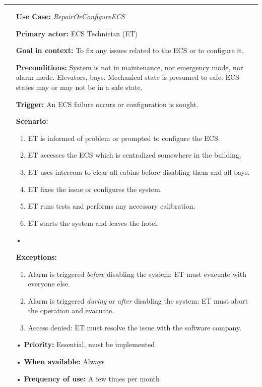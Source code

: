 \documentclass[12pt]{article}
\begin{document}
	\par\noindent\rule{\textwidth}{0.4pt}
		\begin{itemize} %
			\item[] \textbf{Use Case:} \textit{RepairOrConfigureECS}
			\item[] \textbf{Primary actor:} ECS Technician (ET)
			\item[] \textbf{Goal in context:} To fix any issues related to the ECS or to configure it.
			\item[] \textbf{Preconditions:} System is not in maintenance, nor emergency mode, nor alarm mode. 
			Elevators, bays. Mechanical state is presumed to safe. ECS states may or may not be in a safe state.
			\item[] \textbf{Trigger:} An ECS failure occurs or configuration is sought.
			\item[] { \textbf{Scenario:}
		        \begin{enumerate}
		        	\item ET is informed of problem or prompted to configure the ECS.
		        	\item ET accesses the ECS which is centralized somewhere in the building.
		        	\item ET uses intercom to clear all cabins before disabling them and all bays.
		        	\item ET fixes the issue or configures the system.
		        	\item ET runs tests and performs any necessary calibration.
		        	\item ET starts the system and leaves the hotel.
		        \end{enumerate}}
			\item[•]{\textbf{Exceptions:} 
			    \begin{enumerate}
		        	\item Alarm is triggered \textit{before} disabling the system: ET must evacuate with everyone else.
		        	\item Alarm is triggered \textit{during} or \textit{after} disabling the system: ET must abort the 
		        	operation and evacuate.
		        	\item Access denied: ET must resolve the issue with the software company.
		        \end{enumerate}}
			\item[•] \textbf{Priority:} Essential, must be implemented
			\item[•] \textbf{When available:} Always
			\item[•] \textbf{Frequency of use:} A few times per month

\end{itemize}
\end{document}
